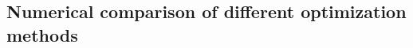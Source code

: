 \documentclass[preprint,12pt]{elsarticle}
\begin{document}
\normalsize

\subsection{Numerical comparison of different optimization methods}
\end{document}

